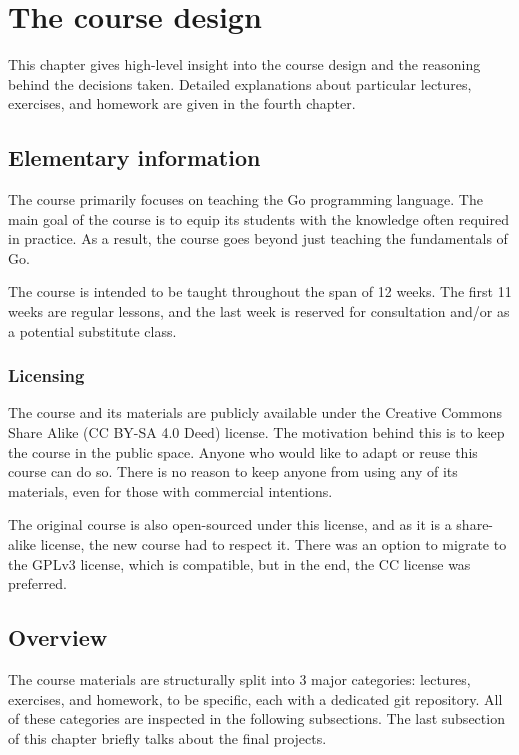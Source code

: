 \documentclass[
  digital,
  color,
  oneside,
  nosansbold,
  nocolorbold,
  lof,
  lot,
]{fithesis4}
\begin{document}
\chapter{The course design}

This chapter gives high-level insight into the course design and the reasoning behind the decisions taken. Detailed explanations about particular lectures, exercises, and homework are given in the fourth chapter.

\section{Elementary information}

The course primarily focuses on teaching the Go programming language. The main goal of the course is to equip its students with the knowledge often required in practice. As a result, the course goes beyond just teaching the fundamentals of Go.

The course is intended to be taught throughout the span of 12 weeks. The first 11 weeks are regular lessons, and the last week is reserved for consultation and/or as a potential substitute class.

\subsection{Licensing}

The course and its materials are publicly available under the Creative Commons Share Alike (CC BY-SA 4.0 Deed) license. The motivation behind this is to keep the course in the public space. Anyone who would like to adapt or reuse this course can do so. There is no reason to keep anyone from using any of its materials, even for those with commercial intentions.

The original course is also open-sourced under this license, and as it is a share-alike license, the new course had to respect it. There was an option to migrate to the GPLv3 license, which is compatible, but in the end, the CC license was preferred.

\section{Overview}

The course materials are structurally split into 3 major categories: lectures, exercises, and homework, to be specific, each with a dedicated git repository. All of these categories are inspected in the following subsections. The last subsection of this chapter briefly talks about the final projects.
\end{document}
